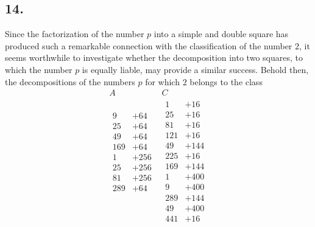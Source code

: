 \documentclass[twoside,12pt]{memoir}
\begin{document}
\subsection*{14.}

Since the factorization of the number \(p\) into a simple and double square has produced such a remarkable connection with the classification of the number \(2\), it seems worthwhile to investigate whether the decomposition into two squares, to which the number \(p\) is equally liable, may provide a similar success. Behold then, the decompositions of the numbers \(p\) for which \(2\) belongs to the class
\[\begin{array}{c|c}
A & C  \\[2pt]
\hline 
\begin{aligned}
9&+64  \\
25&+64  \\
49&+64 \\
169&+64\\
1&+256 \\
25&+256\\
81&+256\\
289&+64 \\ \\ \\ \\ \\
 \end{aligned}
&
\begin{aligned}
 1&+16\\
 25&+16\\
 81&+16\\
 121&+16\\
 49&+144\\
225&+16\\
169&+144\\
1&+400\\
9&+400\\
289&+144\\
49&+400\\
441&+16 
\end{aligned}
\end{array}\]
%
\end{document}
